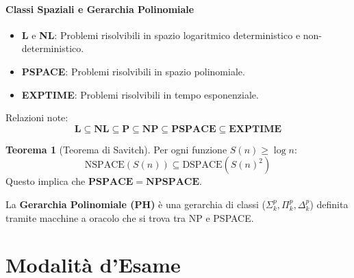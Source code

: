 \documentclass[a4paper]{article}
\theoremstyle{definition} %
\newtheorem{theorem}{Teorema}
\begin{document}
\subsection{Classi Spaziali e Gerarchia Polinomiale}
\begin{itemize}
    \item \textbf{L} e \textbf{NL}: Problemi risolvibili in spazio logaritmico deterministico e non-deterministico.
    \item \textbf{PSPACE}: Problemi risolvibili in spazio polinomiale.
    \item \textbf{EXPTIME}: Problemi risolvibili in tempo esponenziale.
\end{itemize}
Relazioni note:
$$ \mathbf{L} \subseteq \mathbf{NL} \subseteq \mathbf{P} \subseteq \mathbf{NP} \subseteq \mathbf{PSPACE} \subseteq \mathbf{EXPTIME} $$
\begin{theorem}[Teorema di Savitch]
Per ogni funzione $S(n) \ge \log n$:
$$ \text{NSPACE}(S(n)) \subseteq \text{DSPACE}(S(n)^2) $$
Questo implica che $\mathbf{PSPACE} = \mathbf{NPSPACE}$.
\end{theorem}
La \textbf{Gerarchia Polinomiale (PH)} è una gerarchia di classi ($\Sigma_k^p, \Pi_k^p, \Delta_k^p$) definita tramite macchine a oracolo che si trova tra NP e PSPACE.

\part{Modalità d'Esame}
\end{document}
